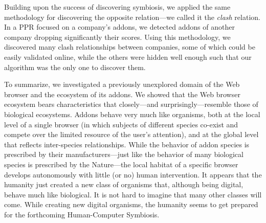 \documentclass[ijoc,nonblindrev]{informs3} %
\numberwithin{equation}{subsection}
\begin{document}
Building upon the success of discovering symbiosis, we applied the same methodology for discovering the opposite relation---we called it the \emph{clash} relation. In a PPR focused on a company's addons, we detected addons of another company dropping significantly their scores. Using this methodology, we discovered many clash relationships between companies, some of which could be easily validated online, while the others were hidden well enough such that our algorithm was the only one to discover them.

To summarize, we investigated a previously unexplored domain of the Web browser and the ecosystem of its addons. We showed that the Web browser ecosystem bears characteristics that closely---and surprisingly---resemble those of biological ecosystems. Addons behave very much like organisms, both at the local level of a single browser (in which subjects of different species co-exist and compete over the limited resource of the user's attention), and at the global level that reflects inter-species relationships. While the behavior of addon species is prescribed by their manufacturers---just like the behavior of many biological species is prescribed by the Nature---the local habitat of a specific browser develops autonomously with little (or no) human intervention. It appears that the humanity just created a new class of organisms that, although being digital, behave much like biological. It is not hard to imagine that many other classes will come. While creating new digital organisms, the humanity seems to get prepared for the forthcoming Human-Computer Symbiosis.

\newpage
{} \label{Bibliography}


\end{document}
